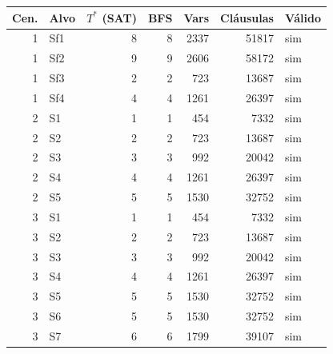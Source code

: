 \begin{center}\small\begin{tabular}{@{}rlrrrrl@{}}\toprule
Cen. & Alvo & $T^*$ (SAT) & BFS & Vars & Cl\'ausulas & V\'alido \\\midrule
1 & Sf1 & 8 & 8 & 2337 & 51817 & sim \\
1 & Sf2 & 9 & 9 & 2606 & 58172 & sim \\
1 & Sf3 & 2 & 2 & 723 & 13687 & sim \\
1 & Sf4 & 4 & 4 & 1261 & 26397 & sim \\
2 & S1 & 1 & 1 & 454 & 7332 & sim \\
2 & S2 & 2 & 2 & 723 & 13687 & sim \\
2 & S3 & 3 & 3 & 992 & 20042 & sim \\
2 & S4 & 4 & 4 & 1261 & 26397 & sim \\
2 & S5 & 5 & 5 & 1530 & 32752 & sim \\
3 & S1 & 1 & 1 & 454 & 7332 & sim \\
3 & S2 & 2 & 2 & 723 & 13687 & sim \\
3 & S3 & 3 & 3 & 992 & 20042 & sim \\
3 & S4 & 4 & 4 & 1261 & 26397 & sim \\
3 & S5 & 5 & 5 & 1530 & 32752 & sim \\
3 & S6 & 5 & 5 & 1530 & 32752 & sim \\
3 & S7 & 6 & 6 & 1799 & 39107 & sim \\
\bottomrule\end{tabular}\end{center}
